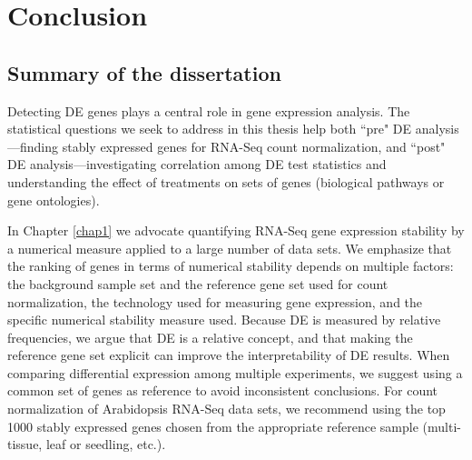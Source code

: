 \pagebreak
\newpage

\section{Conclusion}\label{ch:conclusion}

\subsection{Summary of the dissertation}
Detecting DE genes plays a central role in gene expression analysis. The 
statistical questions we seek to address in this thesis help both ``pre" DE analysis---finding 
stably expressed genes for RNA-Seq count normalization, and ``post" DE analysis---investigating 
correlation among DE test statistics and understanding the effect of treatments on sets of 
genes (biological pathways or gene ontologies).

In Chapter \ref{chap1} we advocate quantifying RNA-Seq gene expression stability by a numerical 
measure applied to a large number of data sets. %
We emphasize that the ranking of genes in terms of numerical stability depends on multiple factors: 
the background sample set and the reference gene set used for count
normalization, the technology used for measuring gene expression, and the specific 
numerical stability measure used. Because DE is measured by relative frequencies, we argue that DE 
is a relative concept, and that making the reference gene set explicit can improve the 
interpretability of DE results.  When comparing differential expression among multiple experiments, 
we suggest using a common set of genes as reference to avoid inconsistent conclusions. For count 
normalization of Arabidopsis RNA-Seq data sets,  we recommend  using the top 1000 stably expressed 
genes chosen from the appropriate reference sample (multi-tissue, leaf or seedling, etc.).

